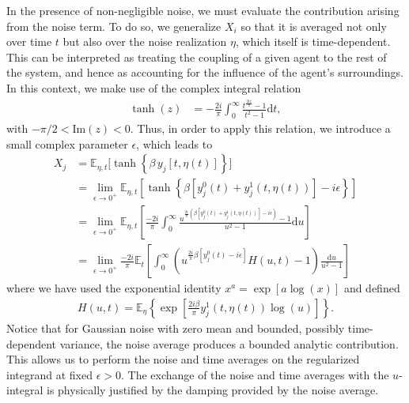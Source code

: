 \documentclass[reprint,amsmath,amssymb,aps]{revtex4-2}
\begin{document}
In the presence of non-negligible noise, we must evaluate the contribution arising from the noise term. To do so, we generalize $X_i$ so that it is averaged not only over time $t$ but also over the noise realization $\eta$, which itself is time-dependent. This can be interpreted as treating the coupling of a given agent to the rest of the system, and hence as accounting for the influence of the agent’s surroundings.  In this context, we make use of the complex integral relation
\begin{align}
    \label{eq:relation_tanh}
    \tanh(z)
    &=
    -\frac{2 i}{\pi}\int_0^\infty
    \frac{t^{\frac{2iz}{\pi}}-1}{t^2-1} \mathrm{d}t,
\end{align}
with $-\pi/2<\text{Im}(z)<0$. Thus, in order to apply this relation, we introduce a small complex parameter $\epsilon$, which leads to
\begin{align}
    X_j 
    &=
    \mathbb{E}_{\eta, t}\big[\tanh\left\{\beta\, y_j\left[t, \eta(t)\right]\right\}\big] \nonumber \\
    &=
    \lim_{\epsilon\rightarrow 0^+}
    \mathbb{E}_{\eta, t} \left[ \tanh\left\{ \beta
    \left[ y_j^0(t)+ y_j^1(t, \eta(t))\right]
    - i \epsilon
    \right\}\right] \nonumber \\
    &=
    \lim_{\epsilon\rightarrow 0^+}
    \mathbb{E}_{\eta, t} \left[
    \frac{-2 i}{\pi}\int_0^\infty
    \frac{u^{\frac{2i}{\pi}\left(\beta
    \left[ y_j^0(t)+ y_j^1(t, \eta(t))\right]
    - i \epsilon\right)}-1}{u^2-1} \mathrm{d}u
    \right] \nonumber \\
    &=
    \label{eq:X_average_field}
    \lim_{\epsilon\rightarrow 0^+}
    \frac{-2i}{\pi}\mathbb{E}_{t}\left[
    \int_0^\infty
    \left(
    u^{\frac{2i}{\pi}\beta
    \left[y_j^0(t) - i \epsilon\right]}
    H(u,t)
    -1
    \right)
\frac{\mathrm{d}u}{u^2-1}
    \right]
\end{align}
where we have used the exponential identity $x^a = \exp\left[a \log(x)\right]$ and defined
\begin{align}
\label{eq:noise_expectation}
    H(u,t) = \mathbb{E}_{\eta} \left\{
    \exp \left[\frac{2i\beta
    }{\pi} y_j^1(t, \eta(t)) \log(u)\right]
    \right\}.  
\end{align}
Notice that for Gaussian noise with zero mean and bounded, possibly time-dependent variance, 
the noise average produces a bounded analytic contribution. 
This allows us to perform the noise and time averages on the regularized integrand at fixed $\epsilon>0$.
The exchange of the noise and time averages with the $u$-integral is physically justified by the damping provided by the noise average.
\end{document}
